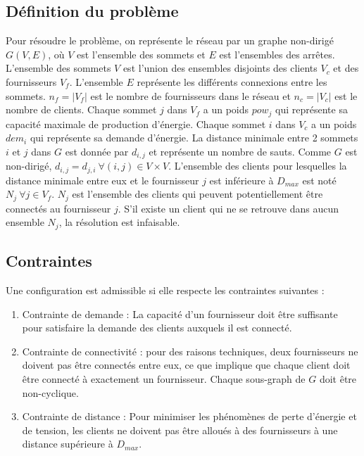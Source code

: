 \documentclass[letterpaper]{article}
\begin{document}
\subsection{Définition du problème}
Pour résoudre le problème, on représente le réseau par un graphe non-dirigé $G(V,E)$, où $V$ est l'ensemble des sommets et $E$ est l'ensembles des arrêtes. L'ensemble des sommets $V$ est l'union des ensembles disjoints des clients  $V_{c}$ et des fournisseurs $V_{f}$. L'ensemble $E$ représente les différents connexions entre les sommets. $n_{f}=|V_{f}| $ est le nombre de fournisseurs dans le réseau et $n_{c}=|V_{c}| $ est le nombre de clients. Chaque sommet $j$ dans $V_{f}$ a un poids $pow_{j}$ qui représente sa capacité maximale de production d'énergie. Chaque sommet $i$ dans $V_{c}$ a un poids $dem_{i}$ qui représente sa demande d'énergie. La distance minimale entre 2 sommets $i$ et $j$ dans $G$ est donnée par $d_{i,j}$ et représente un nombre de sauts. Comme $G$ est non-dirigé, $d_{i,j}=d_{j,i}\ \forall (i,j) \in V \times V$. L'ensemble des clients pour lesquelles la distance minimale entre eux et le fournisseur $j$ est inférieure à $D_{max}$ est noté $N_{j}\ \forall j \in V_{f}$. $N_{j}$ est l'ensemble des clients qui peuvent potentiellement être connectés au fournisseur $j$. S'il existe un client qui ne se retrouve dans aucun ensemble $N_{j}$, la résolution est infaisable.
\subsection{Contraintes}
Une configuration est admissible si elle respecte les contraintes suivantes :
\begin{enumerate}
\item Contrainte de demande : La capacité d'un fournisseur doit être suffisante pour satisfaire la demande des clients auxquels il est connecté.
\item Contrainte de connectivité : pour des raisons techniques, deux fournisseurs ne doivent pas être connectés entre eux, ce que implique que chaque client doit être connecté à exactement un fournisseur. Chaque sous-graph de $G$ doit être non-cyclique.
\item Contrainte de distance : Pour minimiser les phénomènes de perte d'énergie et de tension, les clients ne doivent pas être alloués à des fournisseurs à une distance supérieure à $D_{max}$.   
\end{enumerate}
\end{document}
